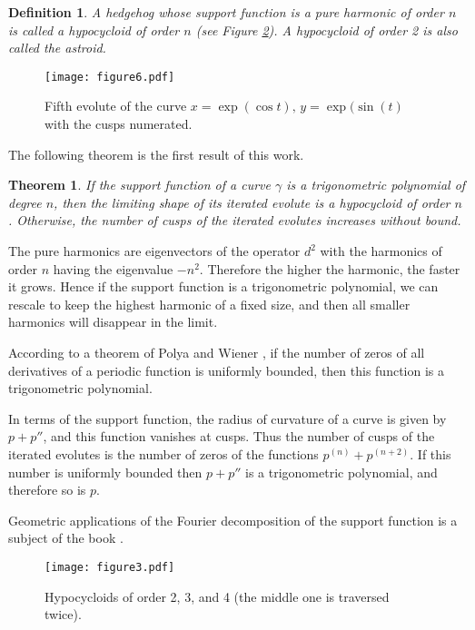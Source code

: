 \documentclass[12pt]{article}
\makeatletter
\newtheorem{theorem}{Theorem}
\newtheorem{definition}[lemma]{Definition}
\renewenvironment{proof}[1][\proofname] 
{\par\pushQED{\qed}\normalfont\topsep6\p@\@plus6\p@\relax\trivlist\item[\hskip\labelsep\bfseries#1\@addpunct{.}]\ignorespaces}{\popQED\endtrivlist\@endpefalse}
\newcommand{\g}{{\gamma}}
\makeatother
\begin{document}
\begin{definition}
\label{hypocycloid}
A hedgehog whose support function is a pure harmonic of order $n$ is called a \emph{hypocycloid of order $n$} (see Figure \ref{hypo}). A hypocycloid of order 2 is also called the \emph{astroid}.
\end{definition}

\begin{figure}[hbtp]
\centering
\texttt{[image: figure6.pdf]}
\caption{Fifth evolute of the  curve $x=\exp(\cos t),\, y =\exp(\sin(t)$ with the cusps numerated.}\label{18cusps}
\end{figure}

The following theorem is the first  result of this work.

\begin{theorem}
\label{growth}
If the support function of a curve $\g$ is a trigonometric polynomial of degree $n$, then the limiting shape of its iterated evolute is a hypocycloid of order $n$. Otherwise, the number of cusps of the iterated evolutes increases without bound.
\end{theorem}

\begin{proof} The pure harmonics are  eigenvectors of the operator $d^2$ with the  harmonics of order $n$ having the eigenvalue  $-n^2$. Therefore the higher the harmonic, the faster it grows.  Hence if the support function is a trigonometric polynomial, we can rescale to keep the highest harmonic of a fixed size, and then all smaller harmonics will disappear in the limit. 
	
According to a theorem of Polya and Wiener \cite{PW}, if the number of zeros of all derivatives of a periodic function is uniformly bounded, then this function is a trigonometric polynomial. 
	
In terms of the support function, the radius of curvature of a curve is given by $p+p''$, and this function vanishes at cusps. Thus the number of cusps of the iterated evolutes is the number of zeros of the functions $p^{(n)} + p^{(n+2)}$. If this number is uniformly bounded then $p+p''$ is a trigonometric polynomial, and therefore so is $p$.\end{proof}

Geometric applications of the Fourier decomposition of the support 
function is a subject of the book \cite{Groe}.

\begin{figure}[hbtp]
\centering
\texttt{[image: figure3.pdf]}
\caption{Hypocycloids of order 2, 3, and 4 (the middle one is traversed twice).}
\label{hypo}
\end{figure}
\end{document}

